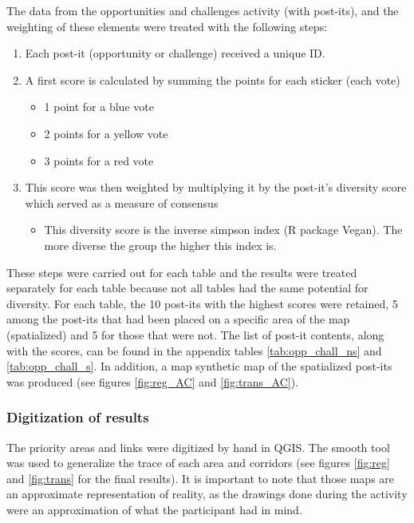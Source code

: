 The data from the opportunities and challenges activity (with post-its), and the weighting of these elements were treated with the following steps:
\begin{enumerate}
  \item Each post-it (opportunity or challenge) received a unique ID.
  \item A first score is calculated by summing the points for each sticker (each vote)
  \begin{itemize}
      \item 1 point for a blue vote
      \item 2 points for a yellow vote
      \item 3 points for a red vote
  \end{itemize}
  \item This score was then weighted by multiplying it by the post-it’s diversity score which served as a measure of consensus
\begin{itemize}
\item This diversity score is the inverse simpson index (R package Vegan). The more diverse the group the higher this index is.
\end{itemize}
\end{enumerate}
These steps were carried out for each table and the results were treated separately for each table because not all tables had the same potential for diversity. For each table, the 10 post-its with the highest scores were retained, 5 among the post-its that had been placed on a specific area of the map (spatialized) and 5 for those that were not. The list of post-it contents, along with the scores, can be found in the appendix tables \ref{tab:opp_chall_ns} and \ref{tab:opp_chall_s}. In addition, a map synthetic map of the spatialized post-its was produced (see figures \ref{fig:reg_AC} and \ref{fig:trans_AC}).\\

\subsubsection*{Digitization of results}

The priority areas and links were digitized by hand in QGIS. The smooth tool was used to generalize the trace of each area and corridors (see figures \ref{fig:reg}  and \ref{fig:trans} for the final results). It is important to note that those maps are an approximate representation of reality, as the drawings done during the activity were an approximation of what the participant had in mind.

